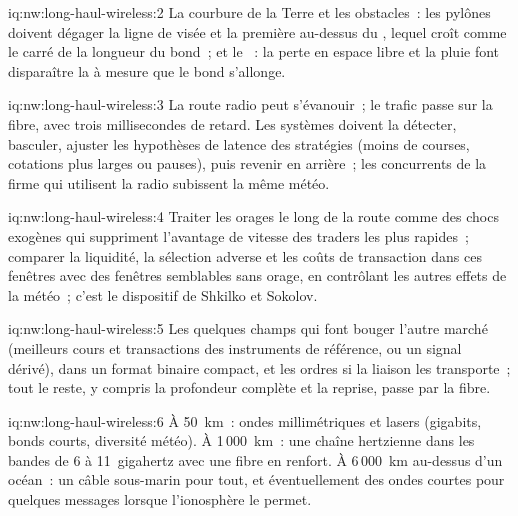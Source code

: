 \begin{solution}{iq:nw:long-haul-wireless:2}
La courbure de la Terre et les obstacles~: les pylônes doivent dégager la ligne de visée et la première  au-dessus du , lequel croît comme le carré
de la longueur du bond~; et le ~: la perte en espace libre et la pluie font disparaître la  à mesure que le bond s'allonge.
\end{solution}

\begin{solution}{iq:nw:long-haul-wireless:3}
La route radio peut s'évanouir~; le trafic passe sur la fibre, avec trois millisecondes de retard. Les systèmes doivent la détecter, basculer, ajuster les hypothèses de latence des
stratégies (moins de courses, cotations plus larges ou pauses), puis revenir en arrière~; les concurrents de la firme qui utilisent la radio subissent la même météo.
\end{solution}

\begin{solution}{iq:nw:long-haul-wireless:4}
Traiter les orages le long de la route comme des chocs exogènes qui suppriment l'avantage de vitesse des traders les plus rapides~; comparer la liquidité, la sélection adverse et
les coûts de transaction dans ces fenêtres avec des fenêtres semblables sans orage, en contrôlant les autres effets de la météo~; c'est le dispositif de Shkilko et Sokolov.
\end{solution}

\begin{solution}{iq:nw:long-haul-wireless:5}
Les quelques champs qui font bouger l'autre marché (meilleurs cours et transactions des instruments de référence, ou un signal dérivé), dans un format binaire compact,
et les ordres si la liaison les transporte~; tout le reste, y compris la profondeur complète et la reprise, passe par la fibre.
\end{solution}

\begin{solution}{iq:nw:long-haul-wireless:6}
À 50~km~: ondes millimétriques et lasers (gigabits, bonds courts, diversité météo). À 1\,000~km~: une chaîne hertzienne dans les bandes de 6 à 11~gigahertz avec une
fibre en renfort. À 6\,000~km au-dessus d'un océan~: un câble sous-marin pour tout, et éventuellement des ondes courtes pour quelques messages lorsque l'ionosphère le permet.
\end{solution}
